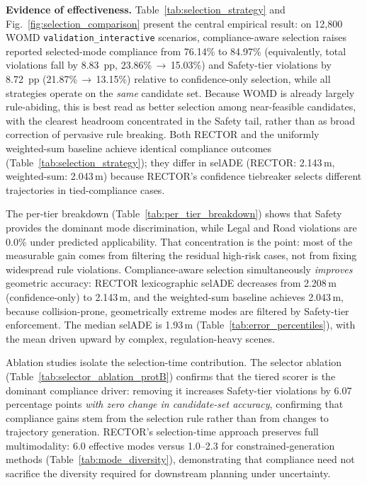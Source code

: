 \textbf{Evidence of effectiveness.}
Table~\ref{tab:selection_strategy} and Fig.~\ref{fig:selection_comparison} present the central empirical result: on 12{,}800 WOMD \texttt{validation\_interactive} scenarios, compliance-aware selection raises reported selected-mode compliance from 76.14\% to 84.97\% (equivalently, total violations fall by 8.83~pp, 23.86\%\,$\to$\,15.03\%) and Safety-tier violations by 8.72~pp (21.87\%\,$\to$\,13.15\%) relative to confidence-only selection, while all strategies operate on the \emph{same} candidate set.  Because WOMD is already largely rule-abiding, this is best read as better selection among near-feasible candidates, with the clearest headroom concentrated in the Safety tail, rather than as broad correction of pervasive rule breaking.  Both RECTOR and the uniformly weighted-sum baseline achieve identical compliance outcomes (Table~\ref{tab:selection_strategy}); they differ in selADE (RECTOR: 2.143\,m, weighted-sum: 2.043\,m) because RECTOR's confidence tiebreaker selects different trajectories in tied-compliance cases.

The per-tier breakdown (Table~\ref{tab:per_tier_breakdown}) shows that Safety provides the dominant mode discrimination, while Legal and Road violations are 0.0\% under predicted applicability.  That concentration is the point: most of the measurable gain comes from filtering the residual high-risk cases, not from fixing widespread rule violations.  Compliance-aware selection simultaneously \emph{improves} geometric accuracy: RECTOR lexicographic selADE decreases from 2.208\,m (confidence-only) to 2.143\,m, and the weighted-sum baseline achieves 2.043\,m, because collision-prone, geometrically extreme modes are filtered by Safety-tier enforcement.  The median selADE is 1.93\,m (Table~\ref{tab:error_percentiles}), with the mean driven upward by complex, regulation-heavy scenes.

Ablation studies isolate the selection-time contribution.  The selector ablation (Table~\ref{tab:selector_ablation_protB}) confirms that the tiered scorer is the dominant compliance driver: removing it increases Safety-tier violations by 6.07 percentage points \emph{with zero change in candidate-set accuracy}, confirming that compliance gains stem from the selection rule rather than from changes to trajectory generation.  RECTOR's selection-time approach preserves full multimodality: 6.0 effective modes versus 1.0--2.3 for constrained-generation methods (Table~\ref{tab:mode_diversity}), demonstrating that compliance need not sacrifice the diversity required for downstream planning under uncertainty.

